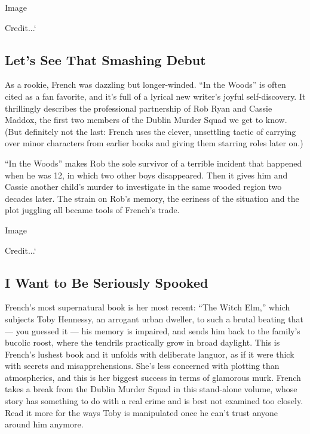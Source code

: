 Image

Credit...`

\hypertarget{lets-see-that-smashing-debut}{%
\subsection{Let's See That Smashing
Debut}\label{lets-see-that-smashing-debut}}

As a rookie, French was dazzling but longer-winded. ``In the Woods'' is
often cited as a fan favorite, and it's full of a lyrical new writer's
joyful self-discovery. It thrillingly describes the professional
partnership of Rob Ryan and Cassie Maddox, the first two members of the
Dublin Murder Squad we get to know. (But definitely not the last: French
uses the clever, unsettling tactic of carrying over minor characters
from earlier books and giving them starring roles later on.)

``In the Woods'' makes Rob the sole survivor of a terrible incident that
happened when he was 12, in which two other boys disappeared. Then it
gives him and Cassie another child's murder to investigate in the same
wooded region two decades later. The strain on Rob's memory, the
eeriness of the situation and the plot juggling all became tools of
French's trade.

Image

Credit...`

\hypertarget{i-want-to-be-seriously-spooked}{%
\subsection{I Want to Be Seriously
Spooked}\label{i-want-to-be-seriously-spooked}}

French's most supernatural book is her most recent: ``The Witch Elm,''
which subjects Toby Hennessy, an arrogant urban dweller, to such a
brutal beating that --- you guessed it --- his memory is impaired, and
sends him back to the family's bucolic roost, where the tendrils
practically grow in broad daylight. This is French's lushest book and it
unfolds with deliberate languor, as if it were thick with secrets and
misapprehensions. She's less concerned with plotting than atmospherics,
and this is her biggest success in terms of glamorous murk. French takes
a break from the Dublin Murder Squad in this stand-alone volume, whose
story has something to do with a real crime and is best not examined too
closely. Read it more for the ways Toby is manipulated once he can't
trust anyone around him anymore.

